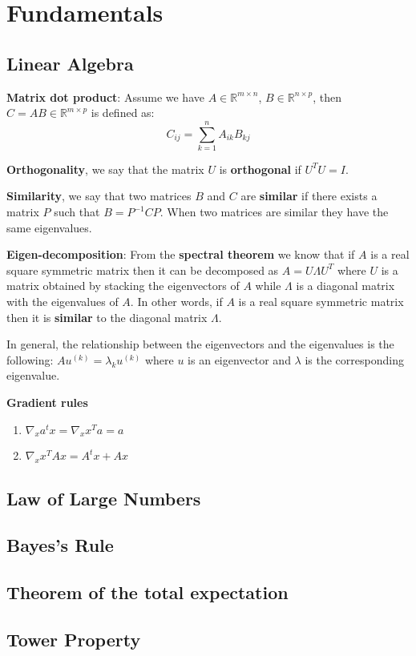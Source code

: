 \chapter{Fundamentals}
\section{Linear Algebra}
\textbf{Matrix dot product}: Assume we have $A \in \mathbb{R}^{m \times n}$, $B \in \mathbb{R}^{n \times p}$, then $C = A B \in \mathbb{R}^{m \times p}$ is defined as:
\[
    C_{ij} = \sum_{k = 1}^{n} A_{ik} B_{kj}
\]

\textbf{Orthogonality}, we say that the matrix $U$ is \textbf{orthogonal} if $U^T U = I$.

\textbf{Similarity}, we say that two matrices $B$ and $C$ are \textbf{similar} if there exists a matrix $P$ such that $B = P^{-1} C P$. When two matrices are similar they have the same eigenvalues.

\textbf{Eigen-decomposition}: From the \textbf{spectral theorem} we know that if $A$ is a real square symmetric matrix then it can be decomposed as $A = U \Lambda U^T$ where $U$ is a matrix obtained by stacking the eigenvectors of $A$ while $\Lambda$ is a diagonal matrix with the eigenvalues of $A$. In other words, if $A$ is a real square symmetric matrix then it is \textbf{similar} to the diagonal matrix $\Lambda$.

In general, the relationship between the eigenvectors and the eigenvalues is the following: $A u^{(k)} = \lambda_k u^{(k)}$ where $u$ is an eigenvector and $\lambda$ is the corresponding eigenvalue.

\textbf{Gradient rules}
\begin{enumerate}
    \item $\nabla_x a^t x = \nabla_x x^T a =  a$
    \item $\nabla_x x^T A x = A^t x + A x$
\end{enumerate}

\section{Law of Large Numbers}

\section{Bayes's Rule}

\section{Theorem of the total expectation}

\section{Tower Property}





